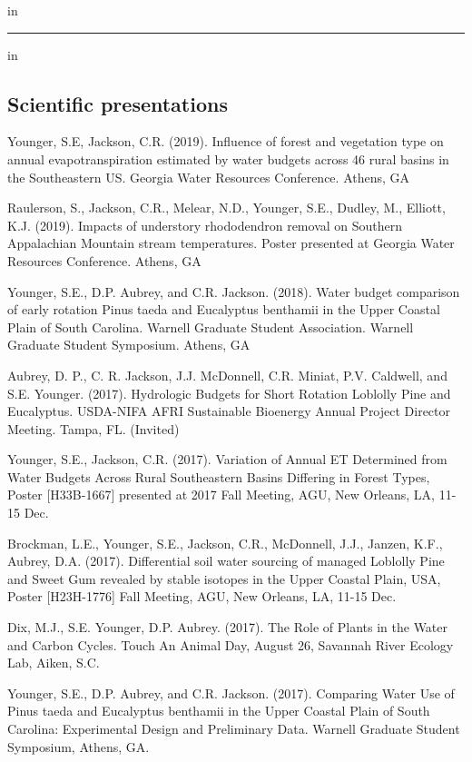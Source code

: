 \documentclass[10pt,letterpaper]{article}
\begin{document}
 in

\hrule
\vspace{-0.4em}
 in
\subsection*{Scientific presentations}

\begin{hangparas}{.25in}{1}
	
	Younger, S.E, Jackson, C.R. (2019). Influence of forest and vegetation type on annual
	evapotranspiration estimated by water budgets across
	46 rural basins in the Southeastern US. Georgia Water Resources Conference. Athens, GA
	
	Raulerson, S., Jackson, C.R., Melear, N.D., Younger, S.E., Dudley, M., Elliott, K.J. (2019). Impacts of understory rhododendron removal on Southern Appalachian Mountain stream temperatures. Poster presented at Georgia Water Resources Conference. Athens, GA
	
	Younger, S.E., D.P. Aubrey, and C.R. Jackson. (2018). Water budget comparison of early rotation Pinus taeda and Eucalyptus benthamii in the Upper Coastal Plain of South Carolina. Warnell Graduate Student Association. Warnell Graduate Student Symposium. Athens, GA
	
	Aubrey, D. P., C. R. Jackson, J.J. McDonnell, C.R. Miniat, P.V. Caldwell, and S.E. Younger. (2017). Hydrologic Budgets for Short Rotation Loblolly Pine and Eucalyptus. USDA-NIFA AFRI Sustainable Bioenergy Annual Project Director Meeting. Tampa, FL. (Invited)
	
	Younger, S.E., Jackson, C.R. (2017). Variation of Annual ET Determined from Water Budgets Across Rural Southeastern Basins Differing in Forest Types, Poster [H33B-1667] presented at 2017 Fall Meeting, AGU, New Orleans, LA, 11-15 Dec.
	
	Brockman, L.E., Younger, S.E., Jackson, C.R., McDonnell, J.J., Janzen, K.F., Aubrey, D.A. (2017). Differential soil water sourcing of managed Loblolly Pine and Sweet Gum revealed by stable isotopes in the Upper Coastal Plain, USA, Poster [H23H-1776] Fall Meeting, AGU, New Orleans, LA, 11-15 Dec.
	
	Dix, M.J., S.E. Younger, D.P. Aubrey. (2017). The Role of Plants in the Water and Carbon Cycles. Touch An Animal Day, August 26, Savannah River Ecology Lab, Aiken, S.C.
	
	Younger, S.E., D.P. Aubrey, and C.R. Jackson. (2017). Comparing Water Use of Pinus taeda and Eucalyptus benthamii in the Upper Coastal Plain of South Carolina: Experimental Design and Preliminary Data. Warnell Graduate Student Symposium, Athens, GA. 
	

\end{hangparas}
\end{document}
